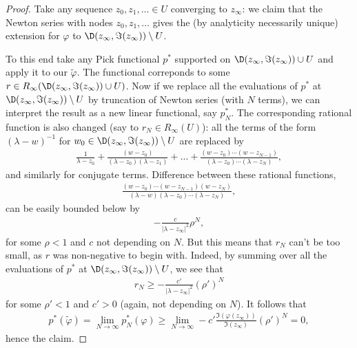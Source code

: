\begin{proof}
	Take any sequence $z_{0}, z_{1}, \ldots \in U$ converging to $z_{\infty}$: we claim that the Newton series with nodes $z_{0}, z_{1}, \ldots$ gives the (by analyticity necessarily unique) extension for $\varphi$ to $\D(z_{\infty}, \Im(z_{\infty})) \setminus U$.

	To this end take any Pick functional $p^{*}$ supported on  $\D(z_{\infty}, \Im(z_{\infty})) \cup U$ and apply it to our $\tilde{\varphi}$. The functional correponds to some $r \in R_{\infty}(\D(z_{\infty}, \Im(z_{\infty})) \cup U)$. Now if we replace all the evaluations of $p^{*}$ at $\D(z_{\infty}, \Im(z_{\infty})) \setminus U$ by truncation of Newton series (with $N$ terms), we can interpret the result as a new linear functional, say $p^{*}_{N}$. The corresponding rational function is also changed (say to $r_{N} \in R_{\infty}(U)$): all the terms of the form $(\lambda - w)^{-1}$ for $w_{0} \in \D(z_{\infty}, \Im(z_{\infty})) \setminus U$ are replaced by
	\begin{align*}
		\frac{1}{\lambda - z_{0}} + \frac{(w - z_{0})}{(\lambda - z_{0}) (\lambda - z_{1})} + \ldots + \frac{(w - z_{0})\cdots (w - z_{N - 1})}{(\lambda - z_{0})\cdots (\lambda - z_{N})},
	\end{align*}
	and similarly for conjugate terms. Difference between these rational functions,
	\begin{align*}
		\frac{(w - z_{0})\cdots (w - z_{N - 1}) (w - z_{N})}{(\lambda - w) (\lambda - z_{0}) \cdots (\lambda - z_{N})},
	\end{align*}
	can be easily bounded below by
	\begin{align*}
		-\frac{c}{|\lambda - z_{\infty}|^2} \rho^{N},
	\end{align*}
	for some $\rho < 1$ and $c$ not depending on $N$. But this means that $r_{N}$ can't be too small, as $r$ was non-negative to begin with. Indeed, by summing over all the evaluations of $p^{*}$ at $\D(z_{\infty}, \Im(z_{\infty})) \setminus U$, we see that
	\begin{align*}
		r_{N} \geq -\frac{c'}{|\lambda - z_{\infty}|^2} (\rho')^{N}
	\end{align*}
	for some $\rho' < 1$ and $c' > 0$ (again, not depending on $N$). It follows that
	\begin{align*}
		p^{*}(\tilde{\varphi}) = \lim_{N \to \infty} p^{*}_{N}(\varphi) \geq \lim_{N \to \infty} -c' \frac{\Im(\varphi(z_{\infty}))}{\Im(z_{\infty})} (\rho')^{N} = 0,
	\end{align*}
	hence the claim.
\end{proof}


